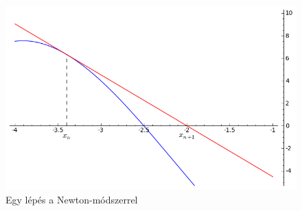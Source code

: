 \documentclass[a4paper,12pt]{report}
\begin{document}
			\begin{figure}[ht]
				\centering
				\includegraphics[scale=0.55]{kep1.png}
				\caption{Egy lépés a Newton-módszerrel}\label{k1}
			\end{figure}
            
\end{document}
